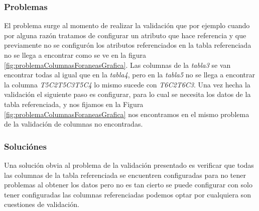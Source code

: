 \subsubsection{Problemas}
El problema surge al momento de realizar la validaci\'on que por ejemplo cuando por alguna raz\'on tratamos de configurar un atributo que hace referencia y que previamente no se configur\'on los atributos referenciados en la tabla referenciada no se llega a encontrar como se ve en la figura \ref{fig:problemaColumnasForaneasGrafica}. Las columnas de la \textit{tabla3} se van encontrar todas al igual que en la \textit{tabla4}, pero en la \textit{tabla5} no se llega a encontrar la columna \textit{T5C2T5C3T5C4} lo mismo sucede con \textit{T6C2T6C3}.
Una vez hecha la validaci\'on el siguiente paso es configurar, para lo cual se necesita los datos de la tabla referenciada, y nos fijamos en la Figura \ref{fig:problemaColumnasForaneasGrafica} nos encontramos en el mismo problema de la validaci\'on de columnas no encontradas.   
\subsubsection{Soluci\'ones}
Una soluci\'on obvia al problema de la validaci\'on presentado es verificar que todas las columnas de la tabla referenciada se encuentren configuradas para no tener problemas al obtener los datos pero no es tan cierto se puede configurar con solo tener configuradas las columnas referenciadas podemos optar por cualquiera son cuestiones de validaci\'on.

